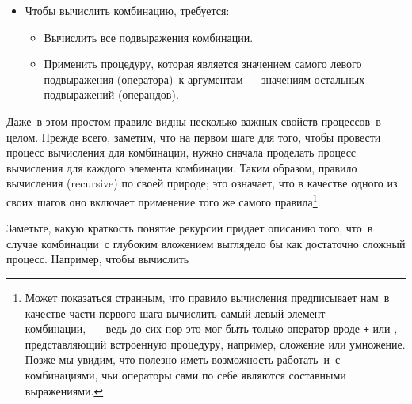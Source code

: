 \begin{itemize}%
\item
Чтобы вычислить комбинацию, требуется:
  \begin{itemize}
\item  Вычислить все подвыражения
    комбинации.

\item Применить процедуру, которая является
    значением самого левого подвыражения (оператора)~к аргументам ---
    значениям остальных подвыражений (операндов).
  \end{itemize}
\end{itemize}
Даже~в этом простом правиле видны несколько важных свойств
процессов~в целом. Прежде всего, заметим, что на первом шаге
для того, чтобы провести процесс вычисления для комбинации,
нужно сначала проделать процесс вычисления для каждого элемента
комбинации.  Таким образом, правило вычисления
 (recursive) по своей природе; это означает, что в
качестве одного из своих шагов оно включает применение того же самого
правила\footnote{Может показаться странным, что правило
вычисления предписывает нам~в качестве части первого шага
вычислить самый левый элемент комбинации,~--- ведь до сих пор это мог 
быть только оператор вроде {\tt +} или
{\tt *}, представляющий встроенную процедуру, например, 
сложение или умножение.  Позже мы увидим, что полезно иметь
возможность работать~и~с комбинациями, чьи операторы сами по себе
являются составными выражениями.
}.

Заметьте, какую краткость понятие рекурсии придает
описанию того, что~в случае комбинации~с глубоким вложением выглядело
бы как достаточно сложный процесс.  Например, чтобы вычислить

